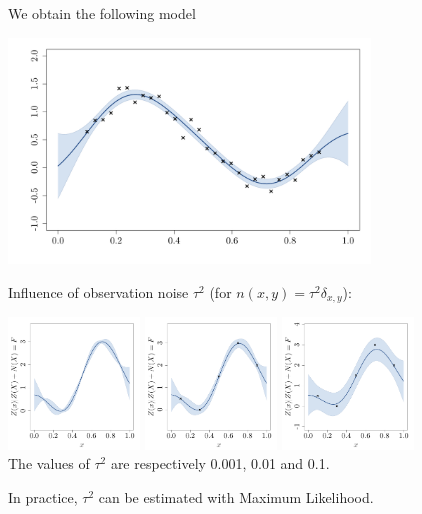 \documentclass{beamer}
\begin{document}
\begin{frame}{}
We obtain the following model
\begin{center}
\includegraphics[height=6cm]{figures/R/noisyGPR} 
\end{center}
\end{frame}

\begin{frame}{}
Influence of observation noise $\tau^2$ (for $n(x,y)=\tau^2 \delta_{x,y}$):
\begin{center}
\includegraphics[height=3.5cm]{figures/R/ch34_GPRnoise0001} 
\includegraphics[height=3.5cm]{figures/R/ch34_GPRnoise001} 
\includegraphics[height=3.5cm]{figures/R/ch34_GPRnoise01}\\
The values of $\tau^2$ are respectively 0.001, 0.01 and 0.1.
\end{center}
In practice, $\tau^2$ can be estimated with Maximum Likelihood. 
\end{frame}
\end{document}
